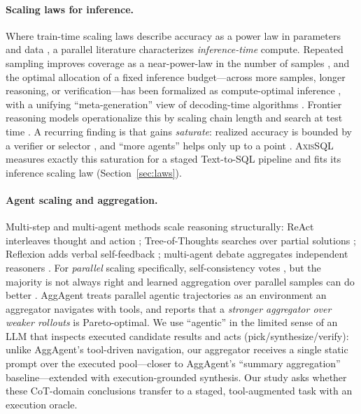 \documentclass{article}
\newcommand{\sys}{\textsc{AxisSQL}\xspace}
\begin{document}
\paragraph{Scaling laws for inference.}
Where train-time scaling laws describe accuracy as a power law in parameters and data \citep{kaplan2020scaling,hoffmann2022chinchilla}, a parallel literature characterizes \emph{inference-time} compute. Repeated sampling improves coverage as a near-power-law in the number of samples \citep{brown2024monkeys,chen2021codex}, and the optimal allocation of a fixed inference budget---across more samples, longer reasoning, or verification---has been formalized as compute-optimal inference \citep{wu2025inference,snell2025scaling}, with a unifying ``meta-generation'' view of decoding-time algorithms \citep{welleck2024decoding}. Frontier reasoning models operationalize this by scaling chain length and search at test time \citep{jaech2024o1,guo2025deepseekr1}. A recurring finding is that gains \emph{saturate}: realized accuracy is bounded by a verifier or selector \citep{cobbe2021verifiers,lightman2024verify}, and ``more agents'' helps only up to a point \citep{li2024moreagents}. \sys{} measures exactly this saturation for a staged Text-to-SQL pipeline and fits its inference scaling law (Section~\ref{sec:laws}).

\paragraph{Agent scaling and aggregation.}
Multi-step and multi-agent methods scale reasoning structurally: ReAct interleaves thought and action \citep{yao2023react}; Tree-of-Thoughts searches over partial solutions \citep{yao2023tot}; Reflexion adds verbal self-feedback \citep{shinn2023reflexion}; multi-agent debate aggregates independent reasoners \citep{du2024debate}. For \emph{parallel} scaling specifically, self-consistency votes \citep{wang2023selfconsistency}, but the majority is not always right and learned aggregation over parallel samples can do better \citep{zhao2025majority,qi2025parallel}. AggAgent \citep{lee2026aggagent} treats parallel agentic trajectories as an environment an aggregator navigates with tools, and reports that a \emph{stronger aggregator over weaker rollouts} is Pareto-optimal. We use ``agentic'' in the limited sense of an LLM that inspects executed candidate results and acts (pick/synthesize/verify): unlike AggAgent's tool-driven navigation, our aggregator receives a single static prompt over the executed pool---closer to AggAgent's ``summary aggregation'' baseline---extended with execution-grounded synthesis. Our study asks whether these CoT-domain conclusions transfer to a staged, tool-augmented task with an execution oracle.
\end{document}
